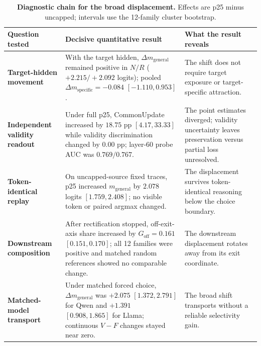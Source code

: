 \documentclass[letterpaper]{article} %
\begin{document}
\begin{table}[t]
\centering
\small
\setlength{\tabcolsep}{4pt}
\renewcommand{\arraystretch}{1.12}
\begin{tabular}{@{}L{0.20\textwidth}L{0.38\textwidth}L{0.34\textwidth}@{}}
\toprule
Question tested & Decisive quantitative result & What the result reveals \\
\midrule

\textbf{Target-hidden}\newline
\textbf{movement}
&
With the target hidden, $\Delta m_{\mathrm{general}}$ remained positive in
$N/R$ ($+2.215/+2.092$ logits); pooled
$\Delta m_{\mathrm{specific}}=-0.084$ $[-1.110,0.953]$.
&
The shift does not require target exposure or target-specific attraction.
\\

\addlinespace

\textbf{Independent validity}\newline
\textbf{readout}
&
Under full p25, CommonUpdate increased by $18.75$ pp
$[4.17,33.33]$ while validity discrimination changed by $0.00$ pp;
layer-60 probe AUC was $0.769/0.767$.
&
The point estimates diverged; validity uncertainty leaves preservation versus partial loss unresolved.
\\

\addlinespace

\textbf{Token-identical}\newline
\textbf{replay}
&
On uncapped-source fixed traces, p25 increased
$m_{\mathrm{general}}$ by $2.078$ logits $[1.759,2.408]$; no visible token or
paired argmax changed.
&
The displacement survives token-identical reasoning below the choice boundary.
\\

\addlinespace

\textbf{Downstream}\newline
\textbf{composition}
&
After rectification stopped, off-exit-axis share increased by
$G_{\mathrm{off}}=0.161$ $[0.151,0.170]$; all 12 families were positive and
matched random references showed no comparable change.
&
The downstream displacement rotates away from its exit coordinate.
\\

\addlinespace

\textbf{Matched-model}\newline
\textbf{transport}
&
Under matched forced choice, $\Delta m_{\mathrm{general}}$ was
$+2.075$ $[1.372,2.791]$ for Qwen and $+1.391$ $[0.908,1.865]$ for Llama;
continuous $V-F$ changes stayed near zero.
&
The broad shift transports without a reliable selectivity gain.
\\

\bottomrule
\end{tabular}
\caption{\textbf{Diagnostic chain for the broad displacement.} Effects are p25 minus uncapped; intervals use the 12-family cluster bootstrap.}
\label{tab:diagnostic-chain}
\end{table}
\end{document}
